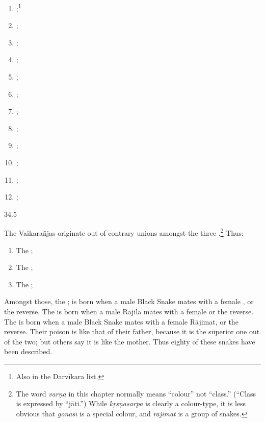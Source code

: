 \begin{translation}
\begin{multicols}{2}
    \begin{enumerate}
        \raggedright
\item {};\footnote{Also in the Darvīkara 
    list.}  
    \item {}; 
    \item {};
    \item {}; 
    \item {}; 
    \item {}; 
    \item {};
    \item {}; 
    \item {}; 
    \item {}; 
    \item {}; 
    \item {};
    \end{enumerate}
\end{multicols}

\medskip

\item[34.5]

The Vaikarañjas originate out of contrary unions amongst the three 
.\footnote{The word 
\emph{varṇa} in this chapter normally means “colour” not “class.”  (“Class is 
expressed by “jāti.”)  While \emph{kṛṣṇasarpa} is clearly a colour-type, it is less 
obvious that \emph{gonasī} is a special colour, and \emph{rājimat} is a group of 
snakes.}
    Thus:

    \begin{enumerate}
        \raggedright
\item The ; 
\item The ; 
\item The ; 
\end{enumerate}

Amongst those, the ;  is born when a male Black Snake
mates with a female , or the reverse.  The
 is born when a male Rājila mates with a female
 or the reverse.  The 
is born when a male Black Snake mates with a female Rājimat, or the
reverse. Their poison is like that of their father, because it is the
superior one out of the two; but others say it is like the mother.   Thus
eighty of these snakes have been described.



\end{translation}
